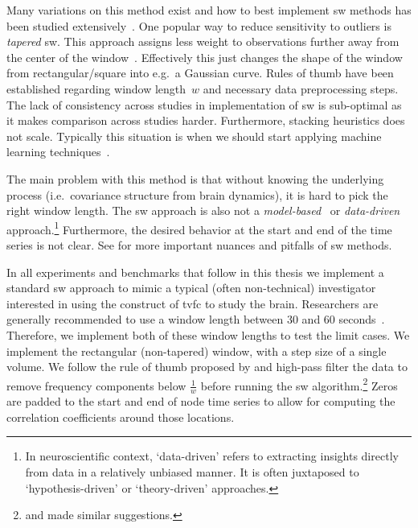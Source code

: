 Many variations on this method exist and how to best implement \gls{sw} methods has been studied extensively~\parencite[see e.g.][]{Mokhtari2019, Vergara2019}.
One popular way to reduce sensitivity to outliers is \emph{tapered} \gls{sw}.
This approach assigns less weight to observations further away from the center of the window~\parencite{Allen2014, Lindquist2014}.
Effectively this just changes the shape of the window from rectangular/square into e.g.~a Gaussian curve.
%
Rules of thumb have been established regarding window length~$w$ and necessary data preprocessing steps.
%
The lack of consistency across studies in implementation of \gls{sw} is sub-optimal as it makes comparison across studies harder.
Furthermore, stacking heuristics does not scale.
Typically this situation is when we should start applying machine learning techniques~\parencite[][built this case beautifully]{Zinkevich2015}.

The main problem with this method is that without knowing the underlying process (i.e.~covariance structure from brain dynamics), it is hard to pick the right window length.
%
The \gls{sw} approach is also not a \emph{model-based}~\parencite{Foti2019} or \emph{data-driven} approach.\footnote{In neuroscientific context, `data-driven' refers to extracting insights directly from data in a relatively unbiased manner. It is often juxtaposed to `hypothesis-driven' or `theory-driven' approaches.}
Furthermore, the desired behavior at the start and end of the time series is not clear.
See \textcite{Lindquist2014, Leonardi2015, Hindriks2016} for more important nuances and pitfalls of \gls{sw} methods.

In all experiments and benchmarks that follow in this thesis we implement a standard \gls{sw} approach to mimic a typical (often non-technical) investigator interested in using the construct of \gls{tvfc} to study the brain.
Researchers are generally recommended to use a window length between 30 and 60 seconds~\parencite{Shirer2012}.
Therefore, we implement both of these window lengths to test the limit cases.
We implement the rectangular (non-tapered) window, with a step size of a single volume.
We follow the rule of thumb proposed by \textcite{Leonardi2015} and high-pass filter the data to remove frequency components below $\frac{1}{w}$ before running the \gls{sw} algorithm.\footnote{\textcite{Smith2012} and \textcite{Hutchison2013} made similar suggestions.}
Zeros are padded to the start and end of node time series to allow for computing the correlation coefficients around those locations.

